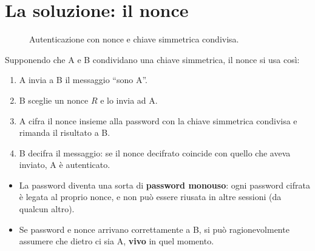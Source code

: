\section{La soluzione: il nonce}


\begin{figure}[H]
\centering
{}
\caption{Autenticazione con nonce e chiave simmetrica condivisa.}
\end{figure}

Supponendo che A e B condividano una chiave simmetrica, il nonce si usa così:

\begin{enumerate}
    \item A invia a B il messaggio ``sono A''.
    \item B sceglie un nonce $R$ e lo invia ad A.
    \item A cifra il nonce insieme alla password con la chiave simmetrica condivisa e rimanda il risultato a B.
    \item B decifra il messaggio: se il nonce decifrato coincide con quello che aveva inviato, A è autenticato.
\end{enumerate}

\begin{itemize}
    \item La password diventa una sorta di \textbf{password monouso}: ogni password cifrata è legata al proprio nonce, e non può essere riusata in altre
          sessioni (da qualcun altro).
    \item Se password e nonce arrivano correttamente a B, si può ragionevolmente assumere che dietro ci sia A, \textbf{vivo} in quel momento.
\end{itemize}

